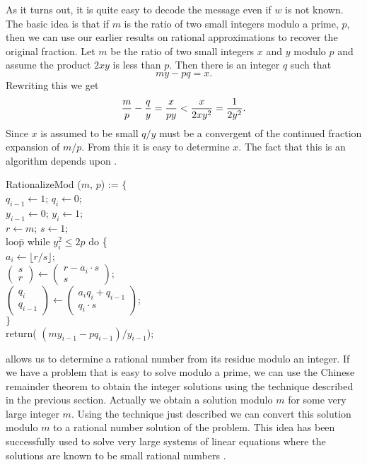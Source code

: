 As it turns out, it is quite easy to decode the message even if $w$ is
not known.  The basic idea is that if $m$ is the ratio of two small
integers modulo a prime, $p$, then we can use our earlier results on
rational approximations to recover the original fraction.
Let $m$ be the ratio of two small integers $x$ and $y$ modulo $p$ and assume
the product $2xy$ is less than $p$.  Then there is an integer $q$ such that
\[
my - pq = x.
\]
Rewriting this we get
\[
{m \over p} -  {q \over y} = {x \over p y} < {x \over 2 x y^2} = {1 \over
2 y^2}.
\]
Since $x$ is assumed to be small $q/ y$ must be a convergent of the
continued fraction expansion of $m/p$.  From this it is easy to
determine $x$.  The fact that this is an algorithm depends upon
.

\begindsacode
RationalizeMod ($m$, $p$) := $\{$ \\
\> $q_{i-1} \leftarrow 1$; $q_i \leftarrow 0$; \\
\> $y_{i-1} \leftarrow 0$; $y_i \leftarrow 1$; \\
\> $r \leftarrow m$; $s \leftarrow 1$; \\
\> loo\=p while $y_i^2 \le 2p$ do \{ \\
\>\> $a_i \leftarrow \lfloor r/s \rfloor$; \\
\>\> $\left(\!\!\begin{array}{c}s \\ r\end{array}\!\!\right) \leftarrow
   \left(\!\!\begin{array}{c} r - a_i \cdot s \\ s \end{array}\!\!\right)$; \\
\>\> $\left(\!\!\begin{array}{c}q_i \\ q_{i-1}\end{array}\!\!\right) \leftarrow
   \left(\!\!\begin{array}{c} a_i q_i + q_{i-1} \\ q_i \cdot s 
   \end{array}\!\!\right)$; \\
\>\> $\}$ \\
\> return( $(m y_{i-1} - p q_{i-1})/y_{i-1}$);
\enddsacode

 allows us to determine a rational number from
its residue modulo an integer.  If we have a problem that is easy to
solve modulo a prime, we can use the Chinese remainder theorem to
obtain the integer solutions using the technique described in the
previous section.  Actually we obtain a solution modulo $m$ for some
very large integer $m$.  Using the technique just described we can
convert this solution modulo $m$ to a rational number solution of the
problem.  This idea has been successfully used to solve very large
systems of linear equations where the solutions are known to be small
rational numbers \cite{Bender1977-yp}.

